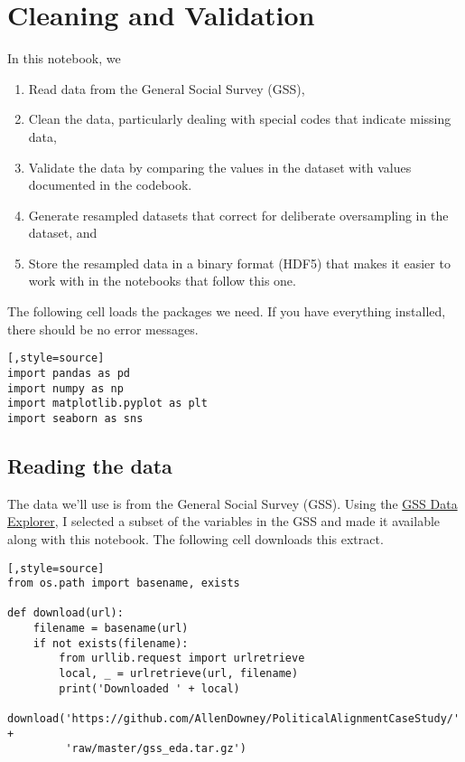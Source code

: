 \hypertarget{cleaning-and-validation}{%
\chapter{Cleaning and Validation}\label{cleaning-and-validation}}

In this notebook, we

\begin{enumerate}
\def\labelenumi{\arabic{enumi}.}
\item
  Read data from the General Social Survey (GSS),
\item
  Clean the data, particularly dealing with special codes that indicate
  missing data,
\item
  Validate the data by comparing the values in the dataset with values
  documented in the codebook.
\item
  Generate resampled datasets that correct for deliberate oversampling
  in the dataset, and
\item
  Store the resampled data in a binary format (HDF5) that makes it
  easier to work with in the notebooks that follow this one.
\end{enumerate}

The following cell loads the packages we need. If you have everything
installed, there should be no error messages.

\begin{lstlisting}[,style=source]
import pandas as pd
import numpy as np
import matplotlib.pyplot as plt
import seaborn as sns
\end{lstlisting}

\hypertarget{reading-the-data}{%
\section{Reading the data}\label{reading-the-data}}

The data we'll use is from the General Social Survey (GSS). Using the
\href{https://gssdataexplorer.norc.org/projects/52787}{GSS Data
Explorer}, I selected a subset of the variables in the GSS and made it
available along with this notebook. The following cell downloads this
extract.

\begin{lstlisting}[,style=source]
from os.path import basename, exists

def download(url):
    filename = basename(url)
    if not exists(filename):
        from urllib.request import urlretrieve
        local, _ = urlretrieve(url, filename)
        print('Downloaded ' + local)

download('https://github.com/AllenDowney/PoliticalAlignmentCaseStudy/' +
         'raw/master/gss_eda.tar.gz')
\end{lstlisting}

